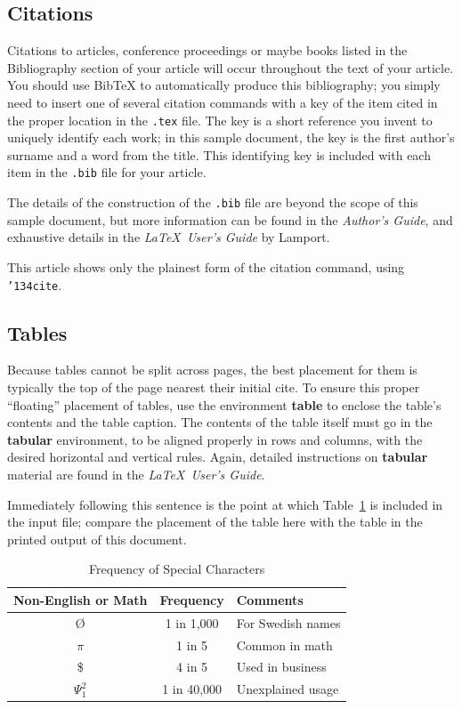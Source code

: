 \subsection{Citations}
Citations to articles,
conference proceedings or maybe
books listed
in the Bibliography section of your
article will occur throughout the text of your article.
You should use BibTeX to automatically produce this bibliography;
you simply need to insert one of several citation commands with
a key of the item cited in the proper location in
the \texttt{.tex} file.
The key is a short reference you invent to uniquely
identify each work; in this sample document, the key is
the first author's surname and a
word from the title.  This identifying key is included
with each item in the \texttt{.bib} file for your article.

The details of the construction of the \texttt{.bib} file
are beyond the scope of this sample document, but more
information can be found in the \textit{Author's Guide},
and exhaustive details in the \textit{\LaTeX\ User's
Guide} by Lamport.


This article shows only the plainest form
of the citation command, using \texttt{{\char'134}cite}.

\subsection{Tables}
Because tables cannot be split across pages, the best
placement for them is typically the top of the page
nearest their initial cite.  To
ensure this proper ``floating'' placement of tables, use the
environment \textbf{table} to enclose the table's contents and
the table caption.  The contents of the table itself must go
in the \textbf{tabular} environment, to
be aligned properly in rows and columns, with the desired
horizontal and vertical rules.  Again, detailed instructions
on \textbf{tabular} material
are found in the \textit{\LaTeX\ User's Guide}.

Immediately following this sentence is the point at which
Table~\ref{tab:freq} is included in the input file; compare the
placement of the table here with the table in the printed
output of this document.

\begin{table}
  \caption{Frequency of Special Characters}
  \label{tab:freq}
  \begin{tabular}{ccl}
    \toprule
    Non-English or Math&Frequency&Comments\\
    \midrule
    \O & 1 in 1,000& For Swedish names\\
    $\pi$ & 1 in 5& Common in math\\
    \$ & 4 in 5 & Used in business\\
    $\Psi^2_1$ & 1 in 40,000& Unexplained usage\\
  \bottomrule
\end{tabular}
\end{table}

